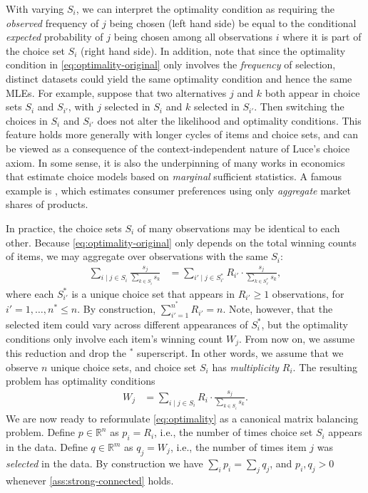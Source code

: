 With varying $S_i$, we can interpret the optimality condition as requiring the \emph{observed} frequency of $j$ being chosen (left hand side) be equal to the conditional \emph{expected} probability of $j$ being chosen among all observations $i$ where it is part of the choice set $S_i$ (right hand side). In addition, note that since the optimality condition in \eqref{eq:optimality-original} only involves the \emph{frequency} of selection, distinct datasets could yield the same optimality condition and hence the same MLEs. For example, suppose that two alternatives $j$ and $k$ both appear in choice sets
$S_{i}$ and $S_{i'}$, with $j$ selected in $S_{i}$ and  $k$ selected in $S_{i'}$. Then switching
the choices in $S_{i}$ and $S_{i'}$ does not alter the likelihood and optimality conditions. This feature holds more generally with longer cycles of items and choice sets, and can be viewed as a consequence of the context-independent nature of Luce's choice axiom. In some sense, it is also the underpinning of many works in economics that estimate choice models based on \emph{marginal} sufficient statistics. A famous example is  \citet{berry1995automobile}, which estimates consumer preferences using only \emph{aggregate} market shares of products.

In practice, the choice sets $S_i$ of many observations may be identical to each other. Because \eqref{eq:optimality-original} only depends on the total winning counts of items, we may aggregate over observations with the same $S_i$:
\begin{align*}
\sum_{i\mid j\in S_{i}}\frac{s_{j}}{\sum_{k\in S_{i}}s_{k}} & = \sum_{i'\mid j\in S^\ast_{i'}} R_{i'} \cdot \frac{s_{j}}{\sum_{k\in S^\ast_{i'}}s_{k}},
\end{align*}
where each $S_{i'}^\ast$ is a unique choice set that appears in $R_{i'}\geq 1$ observations, for $i'=1,\dots,n^\ast \leq n$. By construction, $\sum_{i'=1}^{n^\ast}R_{i'} =n$. Note, however, that the selected item could vary across different appearances of $S_i^\ast$, but the optimality conditions only involve each item's winning count $W_j$. From now on, we assume this reduction and drop the $^\ast$ superscript. In other words, we assume that we observe $n$ unique choice sets, and choice set $S_i$ has \emph{multiplicity} $R_i$. The resulting problem has optimality conditions
\begin{align}
\label{eq:optimality}
{W_j} & = \sum_{i\mid j\in S_{i}}{R_i} \cdot \frac{s_{j}}{\sum_{k\in S_{i}}s_{k}}.
\end{align}
We are now ready to reformulate \eqref{eq:optimality} as a canonical matrix balancing problem. Define $p\in\mathbb{R}^{n}$ as $p_i=R_i$, i.e., the number of times choice set $S_i$ appears in the data. Define
$q\in\mathbb{R}^{m}$ as $q_j={W_j}$,
i.e., the number of times item $j$ was \emph{selected} in the data. By construction we have $\sum_i p_i=\sum_j q_j$, and $p_i,q_j>0$ whenever \cref{ass:strong-connected} holds.

